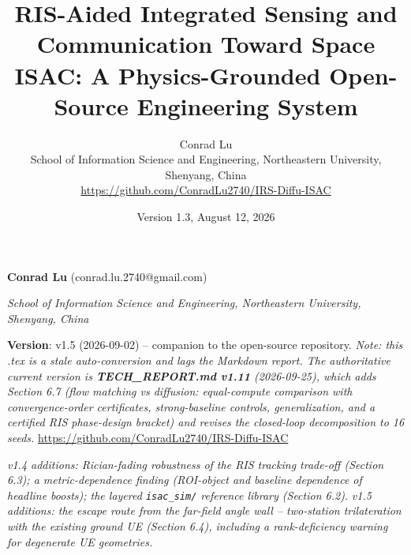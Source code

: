 \documentclass[11pt]{article}
\title{RIS-Aided Integrated Sensing and Communication Toward Space ISAC: A Physics-Grounded Open-Source Engineering System}
\author{Conrad Lu\\[2pt] \small School of Information Science and Engineering, Northeastern University, Shenyang, China\\ \small\url{https://github.com/ConradLu2740/IRS-Diffu-ISAC}}
\date{Version 1.3, August 12, 2026}
\begin{document}
\maketitle

\textbf{Conrad Lu} (conrad.lu.2740@gmail.com)

\textit{School of Information Science and Engineering, Northeastern University, Shenyang, China}

\textbf{Version}: v1.5 (2026-09-02) -- companion to the open-source repository.
\textit{Note: this .tex is a stale auto-conversion and lags the Markdown report. The authoritative current
version is \textbf{TECH\_REPORT.md v1.11} (2026-09-25), which adds Section 6.7 (flow matching vs diffusion:
equal-compute comparison with convergence-order certificates, strong-baseline controls, generalization, and a
certified RIS phase-design bracket) and revises the closed-loop decomposition to 16 seeds.}
\href{https://github.com/ConradLu2740/IRS-Diffu-ISAC}{https://github.com/ConradLu2740/IRS-Diffu-ISAC}

\textit{v1.4 additions: Rician-fading robustness of the RIS tracking trade-off (Section 6.3); a metric-dependence finding (ROI-object and baseline dependence of headline boosts); the layered \texttt{isac\_sim/} reference library (Section 6.2).}
\textit{v1.5 additions: the escape route from the far-field angle wall -- two-station trilateration with the existing ground UE (Section 6.4), including a rank-deficiency warning for degenerate UE geometries.}
\end{document}
